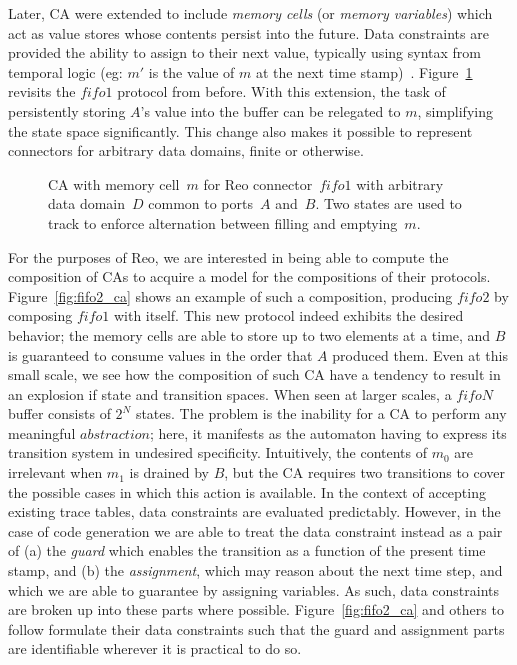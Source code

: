 Later, CA were extended to include \textit{memory cells} (or \textit{memory variables}) which act as value stores whose contents persist into the future. Data constraints are provided the ability to assign to their next value, typically using syntax from temporal logic (eg: $m'$ is the value of $m$ at the next time stamp)~\cite{arbab2007models}. Figure~\ref{fig:fifo1_ca_mem} revisits the $fifo1$ protocol from before. With this extension, the task of persistently storing $A$'s value into the buffer can be relegated to $m$, simplifying the state space significantly. This change also makes it possible to represent connectors for arbitrary data domains, finite or otherwise.



\begin{figure}[ht]
	\centering
	\caption[CA with memory for fifo1 connector.]{CA with memory cell~$m$ for Reo connector~$fifo1$ with arbitrary data domain~$D$ common to ports~$A$ and~$B$. Two states are used to track to enforce alternation between filling and emptying~$m$.}
	\label{fig:fifo1_ca_mem}
\end{figure}


For the purposes of Reo, we are interested in being able to compute the composition of CAs to acquire a model for the compositions of their protocols. Figure~\ref{fig:fifo2_ca} shows an example of such a composition, producing $fifo2$ by composing $fifo1$ with itself. This new protocol indeed exhibits the desired behavior; the memory cells are able to store up to two elements at a time, and $B$ is guaranteed to consume values in the order that $A$ produced them. Even at this small scale, we see how the composition of such CA have a tendency to result in an explosion if state and transition spaces. When seen at larger scales, a $fifoN$ buffer consists of $2^N$ states. The problem is the inability for a CA to perform any meaningful $abstraction$; here, it manifests as the automaton having to express its transition system in undesired specificity. Intuitively, the contents of $m_0$ are irrelevant when $m_1$ is drained by $B$, but the CA requires two transitions to cover the possible cases in which this action is available. In the context of accepting existing trace tables, data constraints are evaluated predictably. However, in the case of code generation we are able to treat the data constraint instead as a pair of (a) the \textit{guard} which enables the transition as a function of the present time stamp, and (b) the \textit{assignment}, which may reason about the next time step, and which we are able to guarantee by assigning variables. As such, data constraints are broken up into these parts where possible. Figure~\ref{fig:fifo2_ca} and others to follow formulate their data constraints such that the guard and assignment parts are identifiable wherever it is practical to do so.


